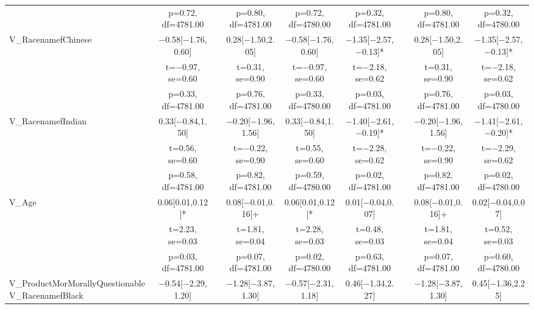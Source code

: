 \documentclass[]{report}
\begin{document}
\begin{table}
{\begin{tabular}[t]{lcccccccc}
		& p=\num{0.72}, df=\num{4781.00} &  & p=\num{0.80}, df=\num{4781.00} & p=\num{0.72}, df=\num{4780.00} & p=\num{0.32}, df=\num{4781.00} &  & p=\num{0.80}, df=\num{4781.00} & p=\num{0.32}, df=\num{4780.00}\\
		V\_RacenamefChinese & \num{-0.58}[\num{-1.76},\num{0.60}] &  & \num{0.28}[\num{-1.50},\num{2.05}] & \num{-0.58}[\num{-1.76},\num{0.60}] & \num{-1.35}[\num{-2.57},\num{-0.13}]* &  & \num{0.28}[\num{-1.50},\num{2.05}] & \num{-1.35}[\num{-2.57},\num{-0.13}]*\\
		& t=\num{-0.97}, se=\num{0.60} &  & t=\num{0.31}, se=\num{0.90} & t=\num{-0.97}, se=\num{0.60} & t=\num{-2.18}, se=\num{0.62} &  & t=\num{0.31}, se=\num{0.90} & t=\num{-2.18}, se=\num{0.62}\\
		& p=\num{0.33}, df=\num{4781.00} &  & p=\num{0.76}, df=\num{4781.00} & p=\num{0.33}, df=\num{4780.00} & p=\num{0.03}, df=\num{4781.00} &  & p=\num{0.76}, df=\num{4781.00} & p=\num{0.03}, df=\num{4780.00}\\
		V\_RacenamefIndian & \num{0.33}[\num{-0.84},\num{1.50}] &  & \num{-0.20}[\num{-1.96},\num{1.56}] & \num{0.33}[\num{-0.84},\num{1.50}] & \num{-1.40}[\num{-2.61},\num{-0.19}]* &  & \num{-0.20}[\num{-1.96},\num{1.56}] & \num{-1.41}[\num{-2.61},\num{-0.20}]*\\
		& t=\num{0.56}, se=\num{0.60} &  & t=\num{-0.22}, se=\num{0.90} & t=\num{0.55}, se=\num{0.60} & t=\num{-2.28}, se=\num{0.62} &  & t=\num{-0.22}, se=\num{0.90} & t=\num{-2.29}, se=\num{0.62}\\
		& p=\num{0.58}, df=\num{4781.00} &  & p=\num{0.82}, df=\num{4781.00} & p=\num{0.59}, df=\num{4780.00} & p=\num{0.02}, df=\num{4781.00} &  & p=\num{0.82}, df=\num{4781.00} & p=\num{0.02}, df=\num{4780.00}\\
		V\_Age & \num{0.06}[\num{0.01},\num{0.12}]* &  & \num{0.08}[\num{-0.01},\num{0.16}]+ & \num{0.06}[\num{0.01},\num{0.12}]* & \num{0.01}[\num{-0.04},\num{0.07}] &  & \num{0.08}[\num{-0.01},\num{0.16}]+ & \num{0.02}[\num{-0.04},\num{0.07}]\\
		& t=\num{2.23}, se=\num{0.03} &  & t=\num{1.81}, se=\num{0.04} & t=\num{2.28}, se=\num{0.03} & t=\num{0.48}, se=\num{0.03} &  & t=\num{1.81}, se=\num{0.04} & t=\num{0.52}, se=\num{0.03}\\
		& p=\num{0.03}, df=\num{4781.00} &  & p=\num{0.07}, df=\num{4781.00} & p=\num{0.02}, df=\num{4780.00} & p=\num{0.63}, df=\num{4781.00} &  & p=\num{0.07}, df=\num{4781.00} & p=\num{0.60}, df=\num{4780.00}\\
		V\_ProductMorMorallyQuestionableV\_RacenamefBlack & \num{-0.54}[\num{-2.29},\num{1.20}] &  & \num{-1.28}[\num{-3.87},\num{1.30}] & \num{-0.57}[\num{-2.31},\num{1.18}] & \num{0.46}[\num{-1.34},\num{2.27}] &  & \num{-1.28}[\num{-3.87},\num{1.30}] & \num{0.45}[\num{-1.36},\num{2.25}]\\

\end{tabular}}
\end{table}
\end{document}
